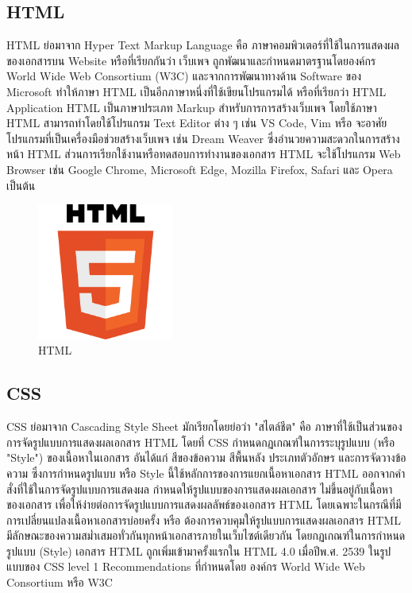 \subsection{HTML}
HTML \cite{web:html} ย่อมาจาก Hyper Text Markup Language คือ ภาษาคอมพิวเตอร์ที่ใช้ในการแสดงผลของเอกสารบน Website หรือที่เรียกกันว่า เว็บเพจ ถูกพัฒนาและกำหนดมาตรฐานโดยองค์กร World Wide Web Consortium (W3C) และจากการพัฒนาทางด้าน Software ของ Microsoft ทำให้ภาษา HTML เป็นอีกภาษาหนึ่งที่ใช้เขียนโปรแกรมได้ หรือที่เรียกว่า HTML Application
HTML เป็นภาษาประเภท Markup สำหรับการการสร้างเว็บเพจ โดยใช้ภาษา HTML สามารถทำโดยใช้โปรแกรม Text Editor ต่าง ๆ เช่น VS Code, Vim หรือ จะอาศัยโปรแกรมที่เป็นเครื่องมือช่วยสร้างเว็บเพจ เช่น Dream Weaver ซึ่งอํานวยความสะดวกในการสร้างหน้า HTML ส่วนการเรียกใช้งานหรือทดสอบการทำงานของเอกสาร HTML จะใช้โปรแกรม Web Browser เช่น Google Chrome, Microsoft Edge, Mozilla Firefox, Safari และ Opera เป็นต้น
\begin{figure}
    \centering
    \includegraphics[width=0.4\textwidth]{img/html.png}
    \caption{HTML}
    \label{fig:html}
\end{figure}

\newpage
\subsection{CSS}
CSS \cite{web:css} ย่อมาจาก Cascading Style Sheet  มักเรียกโดยย่อว่า "สไตล์ชีต" คือ ภาษาที่ใช้เป็นส่วนของการจัดรูปแบบการแสดงผลเอกสาร  HTML โดยที่ CSS กำหนดกฏเกณฑ์ในการระบุรูปแบบ (หรือ "Style") ของเนื้อหาในเอกสาร อันได้แก่ สีของข้อความ สีพื้นหลัง ประเภทตัวอักษร และการจัดวางข้อความ ซึ่งการกำหนดรูปแบบ หรือ Style นี้ใช้หลักการของการแยกเนื้อหาเอกสาร HTML ออกจากคำสั่งที่ใช้ในการจัดรูปแบบการแสดงผล กำหนดให้รูปแบบของการแสดงผลเอกสาร ไม่ขึ้นอยู่กับเนื้อหาของเอกสาร เพื่อให้ง่ายต่อการจัดรูปแบบการแสดงผลลัพธ์ของเอกสาร HTML โดยเฉพาะในกรณีที่มีการเปลี่ยนแปลงเนื้อหาเอกสารบ่อยครั้ง หรือ ต้องการควบคุมให้รูปแบบการแสดงผลเอกสาร HTML มีลักษณะของความสม่ำเสมอทั่วกันทุกหน้าเอกสารภายในเว็บไซต์เดียวกัน  โดยกฏเกณฑ์ในการกำหนดรูปแบบ (Style) เอกสาร HTML ถูกเพิ่มเข้ามาครั้งแรกใน HTML 4.0  เมื่อปีพ.ศ. 2539 ในรูปแบบของ CSS level 1 Recommendations ที่กำหนดโดย องค์กร World Wide Web Consortium หรือ W3C
